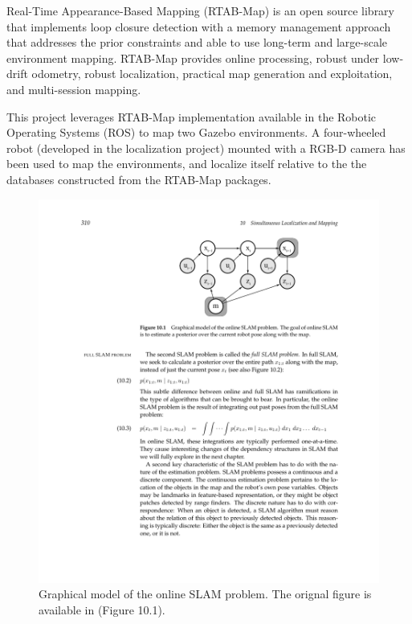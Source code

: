 \documentclass[10pt,journal,compsoc]{IEEEtran}
\begin{document}
Real-Time Appearance-Based Mapping (RTAB-Map) \cite{Labbe:2018} is an open source library that implements loop closure detection with a memory management approach that addresses the prior constraints and able to use long-term and large-scale environment mapping. RTAB-Map provides online processing, robust under low-drift odometry, robust localization, practical map generation and exploitation, and multi-session mapping. 

This project leverages RTAB-Map implementation available in the Robotic Operating Systems (ROS) \cite{288} to map two Gazebo environments. A four-wheeled robot (developed in the localization project) mounted  with a RGB-D camera has been used to map the environments, and localize itself relative to the the databases constructed from the RTAB-Map packages.    

\begin{figure}[thpb]
      \centering
      \includegraphics[width=\linewidth]{online_slam}
      \caption{Graphical model of the online SLAM problem. The orignal figure is available in\cite{Thrun:2005:PR:1121596} (Figure 10.1).}
      \label{fig:online_slam}
\end{figure}
 
\end{document}
